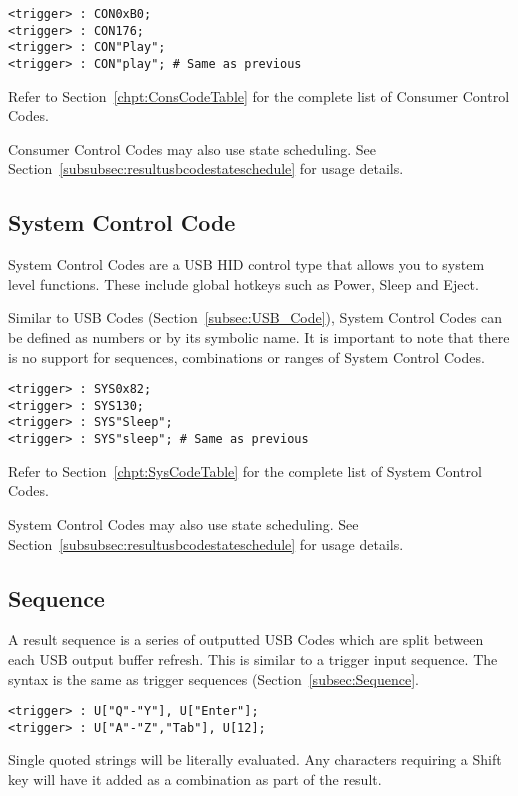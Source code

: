 \documentclass{kiibohd-template}
\begin{document}
\begin{lstlisting}
<trigger> : CON0xB0;
<trigger> : CON176;
<trigger> : CON"Play";
<trigger> : CON"play"; # Same as previous
\end{lstlisting}

Refer to Section~\ref{chpt:ConsCodeTable} for the complete list of Consumer Control Codes.

Consumer Control Codes may also use state scheduling. See Section~\ref{subsubsec:resultusbcodestateschedule} for usage details.


\subsection{System Control Code}

System Control Codes are a USB HID control type that allows you to system level functions.
These include global hotkeys such as Power, Sleep and Eject.

Similar to USB Codes (Section~\ref{subsec:USB_Code}), System Control Codes can be defined as numbers or by its symbolic name.
It is important to note that there is no support for sequences, combinations or ranges of System Control Codes.

\begin{lstlisting}
<trigger> : SYS0x82;
<trigger> : SYS130;
<trigger> : SYS"Sleep";
<trigger> : SYS"sleep"; # Same as previous
\end{lstlisting}

Refer to Section~\ref{chpt:SysCodeTable} for the complete list of System Control Codes.

System Control Codes may also use state scheduling. See Section~\ref{subsubsec:resultusbcodestateschedule} for usage details.


\subsection{Sequence}

A result sequence is a series of outputted USB Codes which are split between each USB output buffer refresh.
This is similar to a trigger input sequence.
The syntax is the same as trigger sequences (Section~\ref{subsec:Sequence}.

\begin{lstlisting}
<trigger> : U["Q"-"Y"], U["Enter"];
<trigger> : U["A"-"Z","Tab"], U[12];
\end{lstlisting}

Single quoted strings will be literally evaluated.
Any characters requiring a Shift key will have it added as a combination as part of the result.
\end{document}
